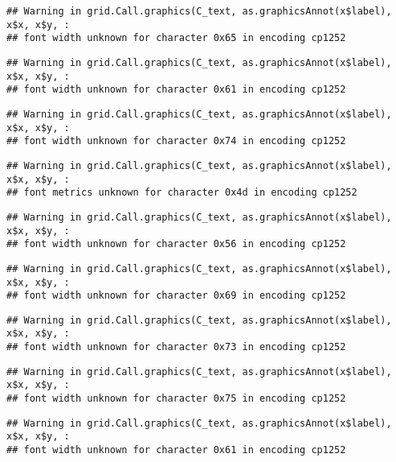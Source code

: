 \documentclass[
]{article}
\begin{document}
\begin{verbatim}
## Warning in grid.Call.graphics(C_text, as.graphicsAnnot(x$label), x$x, x$y, :
## font width unknown for character 0x65 in encoding cp1252
\end{verbatim}

\begin{verbatim}
## Warning in grid.Call.graphics(C_text, as.graphicsAnnot(x$label), x$x, x$y, :
## font width unknown for character 0x61 in encoding cp1252
\end{verbatim}

\begin{verbatim}
## Warning in grid.Call.graphics(C_text, as.graphicsAnnot(x$label), x$x, x$y, :
## font width unknown for character 0x74 in encoding cp1252
\end{verbatim}

\begin{verbatim}
## Warning in grid.Call.graphics(C_text, as.graphicsAnnot(x$label), x$x, x$y, :
## font metrics unknown for character 0x4d in encoding cp1252
\end{verbatim}

\begin{verbatim}
## Warning in grid.Call.graphics(C_text, as.graphicsAnnot(x$label), x$x, x$y, :
## font width unknown for character 0x56 in encoding cp1252
\end{verbatim}

\begin{verbatim}
## Warning in grid.Call.graphics(C_text, as.graphicsAnnot(x$label), x$x, x$y, :
## font width unknown for character 0x69 in encoding cp1252
\end{verbatim}

\begin{verbatim}
## Warning in grid.Call.graphics(C_text, as.graphicsAnnot(x$label), x$x, x$y, :
## font width unknown for character 0x73 in encoding cp1252
\end{verbatim}

\begin{verbatim}
## Warning in grid.Call.graphics(C_text, as.graphicsAnnot(x$label), x$x, x$y, :
## font width unknown for character 0x75 in encoding cp1252
\end{verbatim}

\begin{verbatim}
## Warning in grid.Call.graphics(C_text, as.graphicsAnnot(x$label), x$x, x$y, :
## font width unknown for character 0x61 in encoding cp1252
\end{verbatim}
\end{document}
